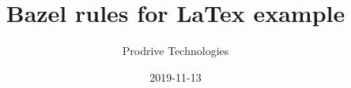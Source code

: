 \documentclass[a4paper]{article}
\title{Bazel rules for LaTex example}
\author{Prodrive Technologies}
\date{2019-11-13}
\begin{document}
\maketitle


\ifdefempty{\usebib}{
	\printbibliography
}{}
\end{document}
